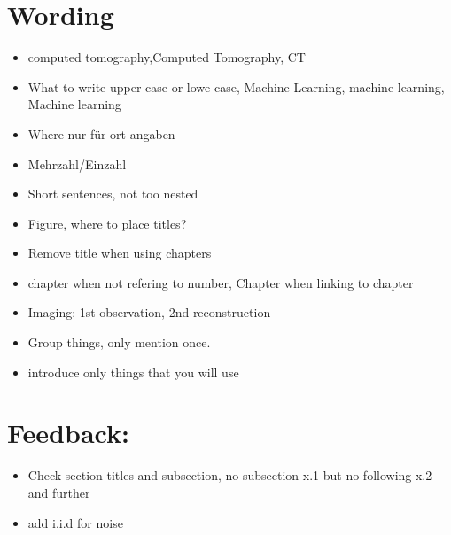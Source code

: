 \section{Wording}
\begin{itemize}
    \item computed tomography,Computed Tomography, CT
    \item What to write upper case or lowe case, Machine Learning, machine learning, Machine learning
    \item Where nur für ort angaben
    \item Mehrzahl/Einzahl
    \item Short sentences, not too nested
    \item Figure, where to place titles?
    \item Remove title when using chapters
    \item chapter when not refering to number, Chapter when linking to chapter
    \item Imaging: 1st observation, 2nd reconstruction
    \item Group things, only mention once.
    \item introduce only things that you will use
\end{itemize}



\section{Feedback:}
\begin{itemize}
    \item Check section titles and subsection, no subsection x.1 but no following x.2 and further
    \item add i.i.d for noise
\end{itemize}


\clearpage
